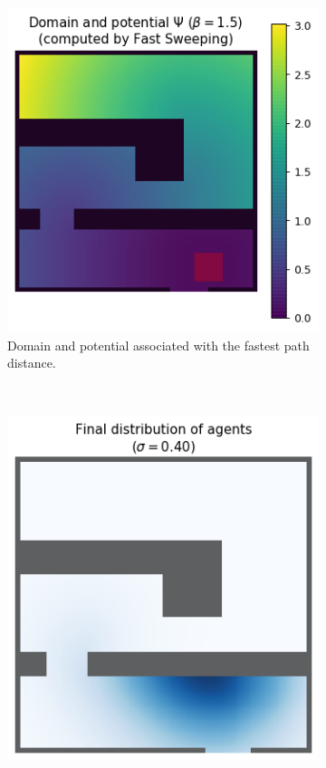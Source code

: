 \documentclass[../report.tex]{subfiles}
\begin{document}
\begin{figure}
	\centering
	\begin{subfigure}[t]{.4\linewidth}
		\centering
		\includegraphics[width=\linewidth]{../project/images/crowd_eikonal_potential.png}
		\caption{Domain and potential associated with the fastest path distance.}\label{fig:CrowdShortedPathPotential}
	\end{subfigure}~
	\begin{subfigure}[t]{.4\linewidth}
		\centering
		\includegraphics[width=\linewidth]{../project/images/eikonal_transport_lowvisc.png}

\end{subfigure}
\end{figure}
\end{document}
